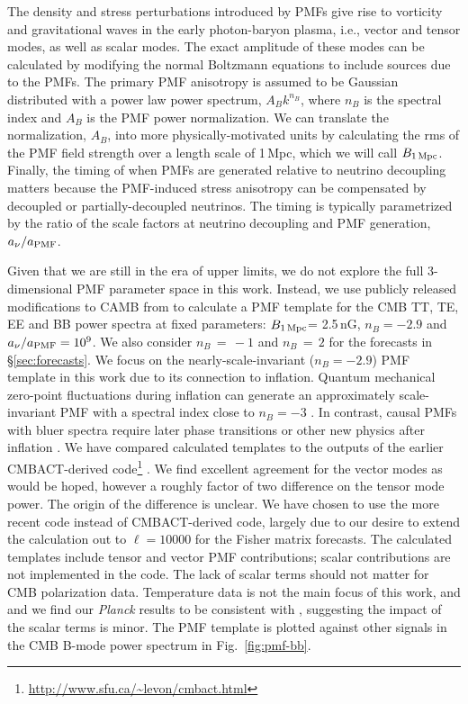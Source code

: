 \documentclass[apj]{emulateapj}
\newcommand{\bpmf}{\ensuremath{B_{\rm 1\,Mpc}}}
\newcommand{\planck}{{\sl Planck}}
\begin{document}
The density and stress perturbations introduced by PMFs give rise to vorticity and gravitational waves in the early photon-baryon  plasma, i.e., vector and tensor modes, as well as scalar modes. 
The exact amplitude of these modes can be calculated by modifying the normal Boltzmann equations to include sources due to the PMFs. 
The primary PMF anisotropy is assumed to be Gaussian distributed with a power law power spectrum, $A_B k^{n_B}$, where $n_B$ is the spectral index and $A_B$ is the PMF power normalization. 
We can translate the normalization, $A_B$, into more physically-motivated units by calculating the rms of the PMF field strength over a length scale of 1\,Mpc, which we will call \bpmf. 
Finally, the timing of when PMFs are generated relative to neutrino decoupling matters because the PMF-induced stress anisotropy can be compensated by decoupled or partially-decoupled neutrinos. 
The timing is typically parametrized by the ratio of the scale factors at neutrino decoupling and PMF generation, $a_{\nu}/a_{\rm{PMF}}$. 

Given that we are still in the era of upper limits, we do not explore the full 3-dimensional PMF parameter space in this work. 
Instead, we use publicly released modifications to CAMB from \citet{zucca16} to calculate a PMF template for the CMB TT, TE, EE and BB power spectra at fixed parameters: \bpmf = 2.5\,nG, $n_B = -2.9$ and $a_{\nu}/a_{\rm{PMF}} = 10^9$. 
We also consider $n_B\,=\,-1$ and $n_B\,=\,2$ for the forecasts in \S\ref{sec:forecasts}. 
We focus on the nearly-scale-invariant ($n_B = -2.9$) PMF template in this work due to its connection to inflation.  
Quantum mechanical zero-point fluctuations during inflation can generate an approximately scale-invariant PMF with a spectral index close to $n_B = -3$ \citep[e.g.,][]{turner88, mack01,2008PhRvD..78f3012K}.%
In contrast, causal PMFs with bluer spectra require later phase transitions or other new physics after inflation \citep[e.g.,][]{durrer03, subramanian16}. 
We have compared calculated templates to the outputs of the earlier CMBACT-derived code\footnote{\url{http://www.sfu.ca/~levon/cmbact.html}} \citep{pogosian99}. 
We find excellent agreement  for the vector modes as would be hoped, however a roughly factor of two difference on the tensor mode power. 
The origin of the difference is unclear. 
We have chosen to use the  more recent \citet{zucca16} code instead of CMBACT-derived code, largely due to our desire to extend the calculation out to $\ell=10000$ for the Fisher matrix forecasts. 
The calculated templates include tensor and vector PMF contributions; scalar contributions are not implemented in the code. 
The lack of scalar terms should not matter for CMB polarization data. 
Temperature data is not the main focus of this work, and  and we find our \planck{} results  to be consistent with \citet{planck15-19}, suggesting the impact of the scalar terms is minor. 
The PMF template is plotted against other signals in the CMB B-mode power spectrum in Fig.~\ref{fig:pmf-bb}. 
\end{document}
